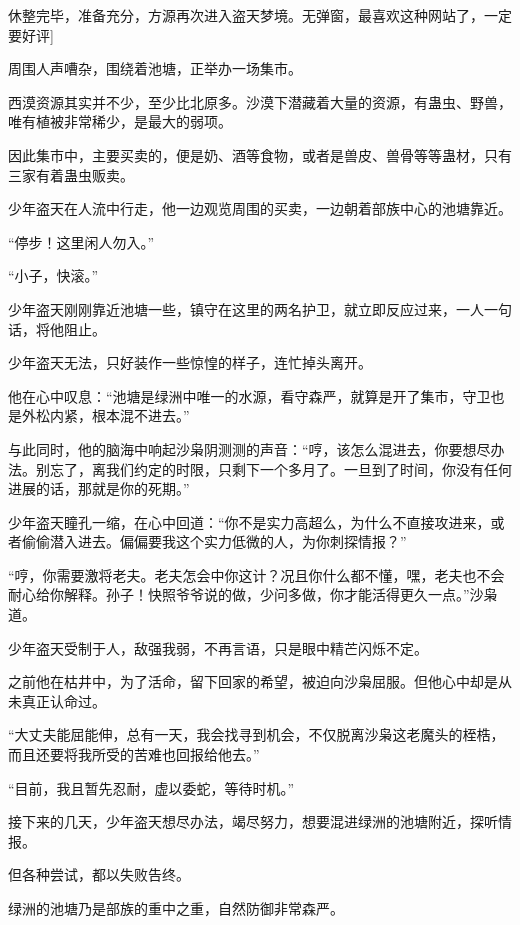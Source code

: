 
\begin{this_body}

休整完毕，准备充分，方源再次进入盗天梦境。无弹窗，最喜欢这种网站了，一定要好评]

周围人声嘈杂，围绕着池塘，正举办一场集市。

西漠资源其实并不少，至少比北原多。沙漠下潜藏着大量的资源，有蛊虫、野兽，唯有植被非常稀少，是最大的弱项。

因此集市中，主要买卖的，便是奶、酒等食物，或者是兽皮、兽骨等等蛊材，只有三家有着蛊虫贩卖。

少年盗天在人流中行走，他一边观览周围的买卖，一边朝着部族中心的池塘靠近。

“停步！这里闲人勿入。”

“小子，快滚。”

少年盗天刚刚靠近池塘一些，镇守在这里的两名护卫，就立即反应过来，一人一句话，将他阻止。

少年盗天无法，只好装作一些惊惶的样子，连忙掉头离开。

他在心中叹息：“池塘是绿洲中唯一的水源，看守森严，就算是开了集市，守卫也是外松内紧，根本混不进去。”

与此同时，他的脑海中响起沙枭阴测测的声音：“哼，该怎么混进去，你要想尽办法。别忘了，离我们约定的时限，只剩下一个多月了。一旦到了时间，你没有任何进展的话，那就是你的死期。”

少年盗天瞳孔一缩，在心中回道：“你不是实力高超么，为什么不直接攻进来，或者偷偷潜入进去。偏偏要我这个实力低微的人，为你刺探情报？”

“哼，你需要激将老夫。老夫怎会中你这计？况且你什么都不懂，嘿，老夫也不会耐心给你解释。孙子！快照爷爷说的做，少问多做，你才能活得更久一点。”沙枭道。

少年盗天受制于人，敌强我弱，不再言语，只是眼中精芒闪烁不定。

之前他在枯井中，为了活命，留下回家的希望，被迫向沙枭屈服。但他心中却是从未真正认命过。

“大丈夫能屈能伸，总有一天，我会找寻到机会，不仅脱离沙枭这老魔头的桎梏，而且还要将我所受的苦难也回报给他去。”

“目前，我且暂先忍耐，虚以委蛇，等待时机。”

接下来的几天，少年盗天想尽办法，竭尽努力，想要混进绿洲的池塘附近，探听情报。

但各种尝试，都以失败告终。

绿洲的池塘乃是部族的重中之重，自然防御非常森严。


\end{this_body}
